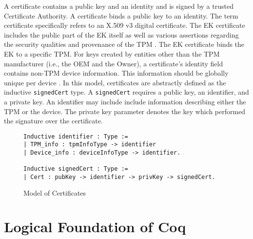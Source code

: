 A certificate contains a public key and an identity and is signed by a trusted Certificate Authority. A certificate binds a public key to an identity. The term certificate specifically refers to an X.509 v3 digital certificate. 
The EK certificate includes the public part of the EK itself as well as various assertions regarding the security qualities and provenance of the TPM \cite{EKSpec}. The EK certificate binds the EK to a specific TPM. For keys created by entities other than the TPM manufacturer (i.e., the OEM and the Owner), a certificate's identity field contains non-TPM device information. This information should be globally unique per device \cite{DevIDSpec-IEEE}. In this model, certificates are abstractly defined as the inductive \verb|signedCert| type. A \verb|signedCert| requires a public key, an identifier, and a private key. An identifier may include include information describing either the TPM or the device. The private key parameter denotes the key which performed the signature over the certificate.
\begin{figure}[h]
\begin{lstlisting}[language=Coq]
Inductive identifier : Type :=
| TPM_info : tpmInfoType -> identifier
| Device_info : deviceInfoType -> identifier.

Inductive signedCert : Type :=
| Cert : pubKey -> identifier -> privKey -> signedCert.
\end{lstlisting}
\caption{Model of Certificates}
\end{figure}





\section{Logical Foundation of Coq}



